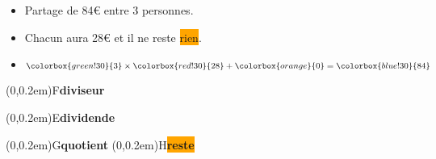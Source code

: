 \begin{exemple*1}
	\phantom{rrr}

	\begin{minipage}{0.5\linewidth}
		\begin{itemize}
			\item Partage de 84\euro{} entre 3 personnes.
			\item Chacun aura \colorbox{red!30}{28}\euro{} et il ne reste \colorbox{orange}{rien}.
			\item $\colorbox{green!30}{3}\times \colorbox{red!30}{28}+ \colorbox{orange}{0}=\colorbox{blue!30}{84}$
		\end{itemize}
	\end{minipage}
	\begin{minipage}{0.5\linewidth}
		\begin{center}
			\qquad
			\begin{minipage}[b]{2cm}
				\pnode(0,0.2em){F}{\colorbox{green!30}{\textbf{diviseur}}}
				\par
				\pnode(0,0.2em){E}{\colorbox{blue!30}{\textbf{dividende}}}
				\par
				\pnode(0,0.2em){G}{\colorbox{red!30}{\textbf{quotient}}}
				\pnode(0,0.2em){H}{\colorbox{orange}{\textbf{reste}}}
			\end{minipage}
		\end{center}
	\end{minipage}	
\end{exemple*1}

